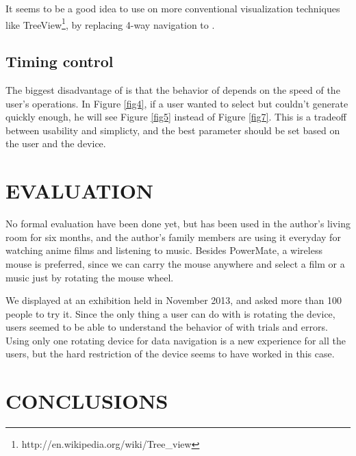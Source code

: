 \documentclass{article}
\begin{document}

It seems to be a good idea to use {\ST} on more conventional visualization techniques like
TreeView\footnote{
  \textsf{http://en.wikipedia.org/wiki/Tree\_view}
}, by replacing 4-way navigation to {\ST}.


\subsection{Timing control}

The biggest disadvantage of {\ST} is that
the behavior of {\ST} depends on the speed of the user's operations.
In Figure \ref{fig4},
if a user wanted to select  but couldn't generate {\D}
quickly enough, he will see Figure \ref{fig5} instead of Figure \ref{fig7}.
This is a tradeoff between usability and simplicty, and
the best parameter should be set based on the user and the {\ST} device.

\section*{EVALUATION}

No formal evaluation have been done yet, but {\ST} has been used in the author's
living room for six months, and the author's family members are using it
everyday for watching anime films and listening to music.
Besides PowerMate, a wireless mouse is preferred,
since we can carry the mouse anywhere and select
a film or a music just by rotating the mouse wheel.

We displayed {\ST} at an exhibition
held in November 2013, and asked more than 100 people to try it.
%
Since the only thing a user can do with {\ST} is rotating the device,
users seemed to be able to understand the behavior of {\ST} with trials and errors.
% 
% 
Using only one rotating device for data navigation is a new experience for
all the users, but the hard restriction of the device seems to have worked in this case.


\section*{CONCLUSIONS}

\small{


}
\end{document}

